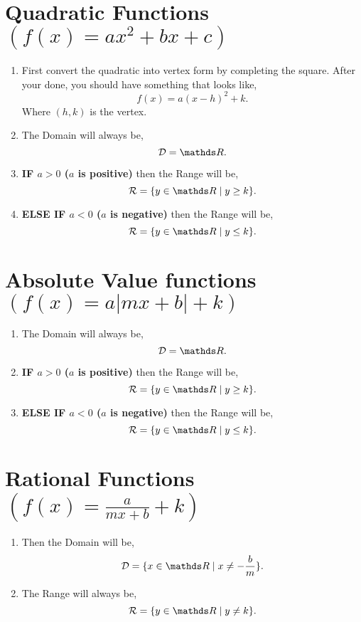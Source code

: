 \documentclass[12pt]{article} %
\begin{document}
  \section{Quadratic Functions $(f(x) = ax^2 + bx + c)$}
  \begin{enumerate}
    \item First convert the quadratic into vertex form by completing the square. After your done, you should have something that
      looks like,
      \[
            f(x) = a\left( x - h  \right)^2 +  k
      .\] 
      Where $(h,k)$ is the vertex.
    \item The Domain will always be,
      \[
        \mathcal{D} = \R
      .\] 
    \item \textbf{IF $a > 0$ ($a$ is positive)} then the Range will be,
      \[
            \mathcal{R} = \{y\in \R \mid y \geq k\} 
      .\] 
    \item \textbf{ELSE IF $a < 0$ ($a$ is negative)} then the Range will be,
      \[
            \mathcal{R} = \{y\in \R \mid y \leq k\} 
      .\] 
  \end{enumerate}

  \section{Absolute Value functions $(f(x) = a|mx + b| + k)$}
  \begin{enumerate}
  \item The Domain will always be,
      \[
        \mathcal{D} = \R
      .\] 
    \item \textbf{IF $a > 0$ ($a$ is positive)} then the Range will be,
      \[
            \mathcal{R} = \{y\in \R \mid y \geq k\} 
      .\] 
    \item \textbf{ELSE IF $a < 0$ ($a$ is negative)} then the Range will be,
      \[
            \mathcal{R} = \{y\in \R \mid y \leq k\} 
      .\] 
  \end{enumerate}

  \section{Rational Functions $(f(x) = \frac{a}{mx + b} + k)$}
  \begin{enumerate}
    \item Then the Domain will be,
      \[
        \mathcal{D} = \{x\in \R \mid x\neq -\frac{b}{m}\} 
      .\]
    \item The Range will always be,
      \[
            \mathcal{R} = \{y \in \R \mid y \neq k\} 
      .\]   \end{enumerate}
\end{document}
